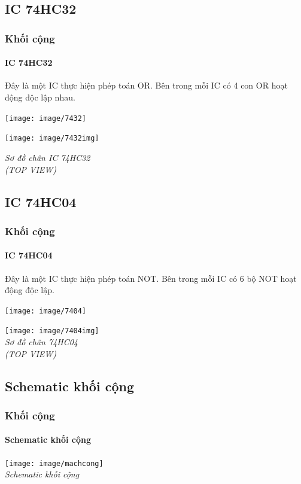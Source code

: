 \documentclass[12pt,a4paper]{beamer}
\begin{document}
\subsection{IC 74HC32}
\begin{frame}
	\frametitle{Khối cộng}
	\framesubtitle{IC 74HC32}
	
	Đây là một IC thực hiện phép toán OR. Bên trong mỗi IC có 4 con OR hoạt động độc lập nhau.
	\begin{multicols}{2}
		\begin{center}
			\texttt{[image: image/7432]}
		\end{center}
		\hfill\null\columnbreak
		\begin{center}
			\texttt{[image: image/7432img]}\\
			\begin{center}
				\textit{Sơ đồ chân IC 74HC32 \\(TOP VIEW)}
			\end{center}
		\end{center}
	\end{multicols}
\end{frame}

\subsection{IC 74HC04}
\begin{frame}
	\frametitle{Khối cộng}
	\framesubtitle{IC 74HC04}
	
	Đây là một IC thực hiện phép toán NOT. Bên trong mỗi IC có 6 bộ NOT hoạt động độc lập.
	\begin{multicols}{2}
		\begin{center}
			\texttt{[image: image/7404]}
		\end{center}
	\hfill\null\columnbreak
		\begin{center}
			\texttt{[image: image/7404img]}\\
			\textit{Sơ đồ chân 74HC04 \\(TOP VIEW)}
		\end{center}
	\end{multicols}
\end{frame}

\subsection{Schematic khối cộng}
\begin{frame}
	\frametitle{Khối cộng}
	\framesubtitle{Schematic khối cộng}
	
	\begin{center}
		\texttt{[image: image/machcong]}\\
		\textit{Schematic khối cộng}
	\end{center}
\end{frame}
\end{document}
